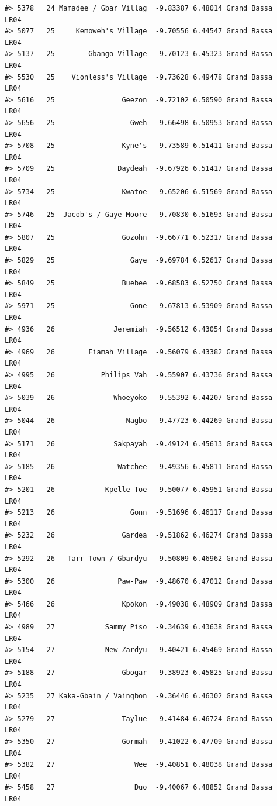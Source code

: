 \documentclass[12pt,a4paper]{book}
\theoremstyle{definition}
\theoremstyle{definition}
\theoremstyle{definition}
\theoremstyle{remark}
\begin{document}
\begin{verbatim}
#> 5378   24 Mamadee / Gbar Villag  -9.83387 6.48014 Grand Bassa       LR04
#> 5077   25     Kemoweh's Village  -9.70556 6.44547 Grand Bassa       LR04
#> 5137   25        Gbango Village  -9.70123 6.45323 Grand Bassa       LR04
#> 5530   25    Vionless's Village  -9.73628 6.49478 Grand Bassa       LR04
#> 5616   25                Geezon  -9.72102 6.50590 Grand Bassa       LR04
#> 5656   25                  Gweh  -9.66498 6.50953 Grand Bassa       LR04
#> 5708   25                Kyne's  -9.73589 6.51411 Grand Bassa       LR04
#> 5709   25               Daydeah  -9.67926 6.51417 Grand Bassa       LR04
#> 5734   25                Kwatoe  -9.65206 6.51569 Grand Bassa       LR04
#> 5746   25  Jacob's / Gaye Moore  -9.70830 6.51693 Grand Bassa       LR04
#> 5807   25                Gozohn  -9.66771 6.52317 Grand Bassa       LR04
#> 5829   25                  Gaye  -9.69784 6.52617 Grand Bassa       LR04
#> 5849   25                Buebee  -9.68583 6.52750 Grand Bassa       LR04
#> 5971   25                  Gone  -9.67813 6.53909 Grand Bassa       LR04
#> 4936   26              Jeremiah  -9.56512 6.43054 Grand Bassa       LR04
#> 4969   26        Fiamah Village  -9.56079 6.43382 Grand Bassa       LR04
#> 4995   26           Philips Vah  -9.55907 6.43736 Grand Bassa       LR04
#> 5039   26              Whoeyoko  -9.55392 6.44207 Grand Bassa       LR04
#> 5044   26                 Nagbo  -9.47723 6.44269 Grand Bassa       LR04
#> 5171   26              Sakpayah  -9.49124 6.45613 Grand Bassa       LR04
#> 5185   26               Watchee  -9.49356 6.45811 Grand Bassa       LR04
#> 5201   26            Kpelle-Toe  -9.50077 6.45951 Grand Bassa       LR04
#> 5213   26                  Gonn  -9.51696 6.46117 Grand Bassa       LR04
#> 5232   26                Gardea  -9.51862 6.46274 Grand Bassa       LR04
#> 5292   26   Tarr Town / Gbardyu  -9.50809 6.46962 Grand Bassa       LR04
#> 5300   26               Paw-Paw  -9.48670 6.47012 Grand Bassa       LR04
#> 5466   26                Kpokon  -9.49038 6.48909 Grand Bassa       LR04
#> 4989   27            Sammy Piso  -9.34639 6.43638 Grand Bassa       LR04
#> 5154   27            New Zardyu  -9.40421 6.45469 Grand Bassa       LR04
#> 5188   27                Gbogar  -9.38923 6.45825 Grand Bassa       LR04
#> 5235   27 Kaka-Gbain / Vaingbon  -9.36446 6.46302 Grand Bassa       LR04
#> 5279   27                Taylue  -9.41484 6.46724 Grand Bassa       LR04
#> 5350   27                Gormah  -9.41022 6.47709 Grand Bassa       LR04
#> 5382   27                   Wee  -9.40851 6.48038 Grand Bassa       LR04
#> 5458   27                   Duo  -9.40067 6.48852 Grand Bassa       LR04

\end{verbatim}
\end{document}
